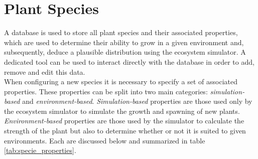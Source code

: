 \section{Plant Species} \label{sec:plant_species}

A database is used to store all plant species and their associated properties, which are used to determine their ability to grow in a given environment and, subsequently, deduce a plausible distribution using the ecosystem simulator. A dedicated tool can be used to interact directly with the database in order to add, remove and edit this data.\\
When configuring a new species it is necessary to specify a set of associated properties. These properties can be split into two main categories: \textit{simulation-based} and \textit{environment-based}. \textit{Simulation-based} properties are those used only by the ecosystem simulator to simulate the growth and spawning of new plants. \textit{Environment-based} properties are those used by the simulator to calculate the strength of the plant but also to determine whether or not it is suited to given environments. Each are discussed below and summarized in table \ref{tab:specie_properties}.\\

